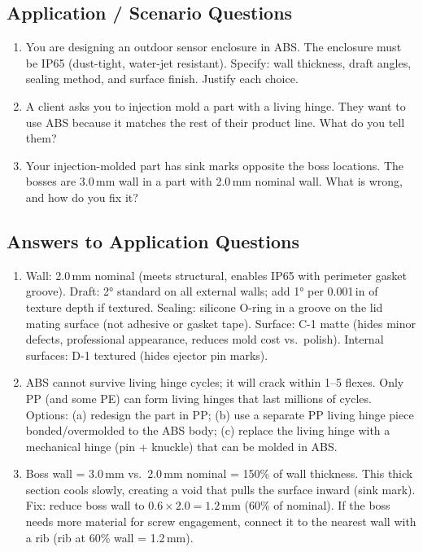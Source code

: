 



\subsection{Application / Scenario Questions}
\begin{enumerate}[leftmargin=1.5em, start=7]
\item You are designing an outdoor sensor enclosure in ABS. The enclosure must be IP65 (dust-tight, water-jet resistant). Specify: wall thickness, draft angles, sealing method, and surface finish. Justify each choice.
\item A client asks you to injection mold a part with a living hinge. They want to use ABS because it matches the rest of their product line. What do you tell them?
\item Your injection-molded part has sink marks opposite the boss locations. The bosses are 3.0\,mm wall in a part with 2.0\,mm nominal wall. What is wrong, and how do you fix it?
\end{enumerate}

\subsection{Answers to Application Questions}
\begin{enumerate}[leftmargin=1.5em, start=7]
\item Wall: 2.0\,mm nominal (meets structural, enables IP65 with perimeter gasket groove). Draft: \ang{2} standard on all external walls; add \ang{1} per 0.001\,in of texture depth if textured. Sealing: silicone O-ring in a groove on the lid mating surface (not adhesive or gasket tape). Surface: C-1 matte (hides minor defects, professional appearance, reduces mold cost vs.\ polish). Internal surfaces: D-1 textured (hides ejector pin marks).
\item ABS cannot survive living hinge cycles; it will crack within 1--5 flexes. Only PP (and some PE) can form living hinges that last millions of cycles. Options: (a) redesign the part in PP; (b) use a separate PP living hinge piece bonded/overmolded to the ABS body; (c) replace the living hinge with a mechanical hinge (pin + knuckle) that can be molded in ABS.
\item Boss wall = 3.0\,mm vs.\ 2.0\,mm nominal = 150\% of wall thickness. This thick section cools slowly, creating a void that pulls the surface inward (sink mark). Fix: reduce boss wall to $0.6 \times 2.0 = 1.2$\,mm (60\% of nominal). If the boss needs more material for screw engagement, connect it to the nearest wall with a rib (rib at 60\% wall = 1.2\,mm).
\end{enumerate}

